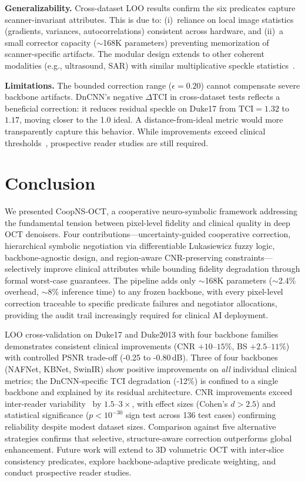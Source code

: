 \documentclass[journal,twoside,web]{ieeecolor}
\begin{document}
\textbf{Generalizability.}
Cross-dataset LOO results confirm the six predicates capture scanner-invariant attributes. This is due to: (i)~reliance on local image statistics (gradients, variances, autocorrelations) consistent across hardware, and (ii)~a small corrector capacity (${\sim}$168K parameters) preventing memorization of scanner-specific artifacts. The modular design extends to other coherent modalities (e.g., ultrasound, SAR) with similar multiplicative speckle statistics~\cite{goodman2007speckle}.

\textbf{Limitations.}
The bounded correction range ($\epsilon = 0.20$) cannot compensate severe backbone artifacts. DnCNN’s negative $\Delta$TCI in cross-dataset tests reflects a beneficial correction: it reduces residual speckle on Duke17 from $\text{TCI} = 1.32$ to $1.17$, moving closer to the 1.0 ideal. A distance-from-ideal metric would more transparently capture this behavior. While improvements exceed clinical thresholds~\cite{stein2006quality}, prospective reader studies are still required.
\section{Conclusion}
\label{sec:conclusion}

We presented CoopNS-OCT, a cooperative neuro-symbolic framework addressing the fundamental tension between pixel-level fidelity and clinical quality in deep OCT denoisers. Four contributions---uncertainty-guided cooperative correction, hierarchical symbolic negotiation via differentiable Lukasiewicz fuzzy logic, backbone-agnostic design, and region-aware CNR-preserving constraints---selectively improve clinical attributes while bounding fidelity degradation through formal worst-case guarantees. The pipeline adds only ${\sim}$168K parameters (${\sim}$2.4\% overhead, ${\sim}$8\% inference time) to any frozen backbone, with every pixel-level correction traceable to specific predicate failures and negotiator allocations, providing the audit trail increasingly required for clinical AI deployment.

LOO cross-validation on Duke17 and Duke2013 with four backbone families demonstrates consistent clinical improvements (CNR $+10$--$15\%$, BS $+2.5$--$11\%$) with controlled PSNR trade-off (-0.25 to -0.80\,dB). Three of four backbones (NAFNet, KBNet, SwinIR) show positive improvements on \emph{all} individual clinical metrics; the DnCNN-specific TCI degradation (-12\%) is confined to a single backbone and explained by its residual architecture. CNR improvements exceed inter-reader variability~\cite{stein2006quality} by $1.5$--$3{\times}$, with effect sizes (Cohen's $d > 2.5$) and statistical significance ($p < 10^{-30}$ sign test across 136 test cases) confirming reliability despite modest dataset sizes. Comparison against five alternative strategies confirms that selective, structure-aware correction outperforms global enhancement. Future work will extend to 3D volumetric OCT with inter-slice consistency predicates, explore backbone-adaptive predicate weighting, and conduct prospective reader studies.
\end{document}
